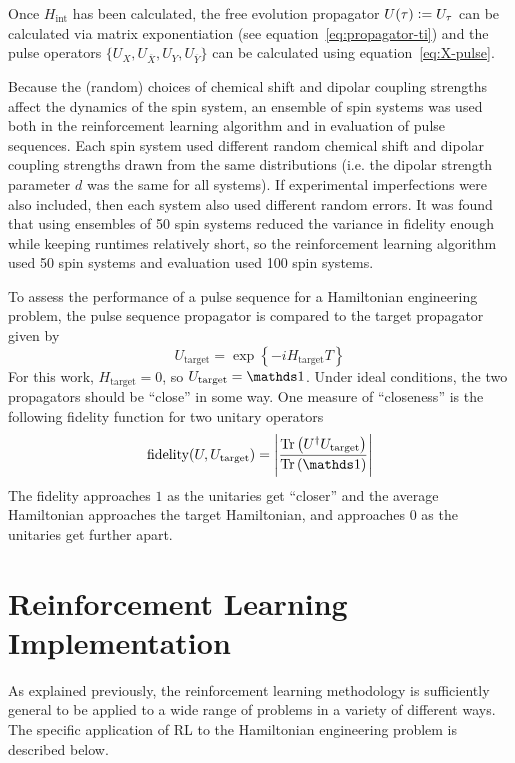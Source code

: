 
Once $H_{\text{int}}$ has been calculated, the free evolution propagator $U(\tau) \mathrel{\mathop:}= U_\tau$ can be calculated via matrix exponentiation (see equation~\ref{eq:propagator-ti})
and
the pulse operators $\{ U_X, U_{\overline{X}}, U_Y, U_{\overline{Y}} \}$ can be calculated using equation~\ref{eq:X-pulse}.

Because the (random) choices of chemical shift and dipolar coupling strengths affect the dynamics of the spin system, an ensemble of spin systems was used both in the reinforcement learning algorithm and in evaluation of pulse sequences.
Each spin system used different random chemical shift and dipolar coupling strengths drawn from the same distributions (i.e. the dipolar strength parameter $d$ was the same for all systems). If experimental imperfections were also included, then each system also used different random errors.
It was found that using ensembles of 50 spin systems reduced the variance in fidelity enough while keeping runtimes relatively short, so
the reinforcement learning algorithm used 50 spin systems and evaluation used 100 spin systems.

To assess the performance of a pulse sequence for a Hamiltonian engineering problem, the pulse sequence propagator is compared to the target propagator given by
\[
U_{\text{target}} = \exp\left\{ -i H_{\text{target}} T \right\}
\]
For this work, $H_{\text{target}} = 0$, so $U_{\text{target}} = \identity$.
Under ideal conditions, the two propagators should be ``close'' in some way. One measure of ``closeness'' is the following fidelity function for two unitary operators
\begin{equation}
    \text{fidelity}(U, U_\text{target}) = \left| \frac{\Tr{
        U^\dagger U_\text{target}
    }}{\Tr{\identity}} \right|
\end{equation}
The fidelity approaches $1$ as the unitaries get ``closer'' and the average Hamiltonian approaches the target Hamiltonian, and approaches $0$ as the unitaries get further apart.

\section{Reinforcement Learning Implementation}\label{sec:methods-RL}

As explained previously,
the reinforcement learning methodology is sufficiently general to be applied to a wide range of problems in a variety of different ways.  The specific application of RL to the Hamiltonian engineering problem is described below.


